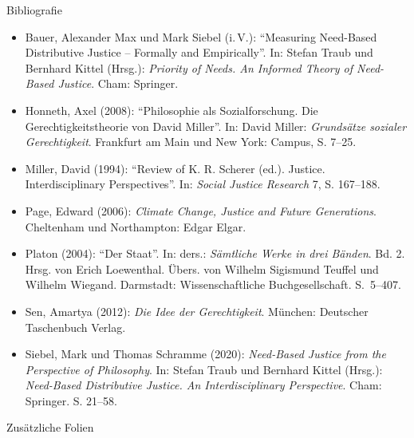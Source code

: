 \documentclass[xcolor=table,9pt,aspectratio=169]{beamer}
\begin{document}
\begin{frame}{\vspace*{10mm}Bibliografie}
\vspace*{-10mm}
{\footnotesize
\begin{itemize}[label=,leftmargin=2em,itemindent=-2em]
   \item Bauer, Alexander Max und Mark Siebel (i.\,V.): \enquote{Measuring Need-Based Distributive Justice -- Formally and Empirically}. In: Stefan Traub und Bernhard Kittel (Hrsg.): \textit{Priority of Needs. An Informed Theory of Need-Based Justice}. Cham: Springer.
   \item Honneth, Axel (2008): \enquote{Philosophie als Sozialforschung. Die Gerechtigkeitstheorie von David Miller}. In: David Miller: \textit{Grundsätze sozialer Gerechtigkeit}. Frankfurt am Main und New York: Campus, S. 7--25.
   \item Miller, David (1994): \enquote{Review of K. R. Scherer (ed.). Justice. Interdisciplinary Perspectives}. In: \textit{Social Justice Research} 7, S. 167--188.
   \item Page, Edward (2006): \textit{Climate Change, Justice and Future Generations}. Cheltenham und Northampton: Edgar Elgar.
   \item Platon (2004): \enquote{Der Staat}. In: ders.: \textit{Sämtliche Werke in drei Bänden}. Bd. 2. Hrsg. von Erich Loewenthal. Übers. von Wilhelm Sigismund Teuffel und Wilhelm Wiegand. Darmstadt: Wissenschaftliche Buchgesellschaft. S.~5--407.
   \item Sen, Amartya (2012): \textit{Die Idee der Gerechtigkeit}. München: Deutscher Taschenbuch Verlag.
   \item Siebel, Mark und Thomas Schramme (2020): \textit{Need-Based Justice from the Perspective of Philosophy}. In: Stefan Traub und Bernhard Kittel (Hrsg.): \textit{Need-Based Distributive Justice. An Interdisciplinary Perspective}. Cham: Springer. S. 21--58.
\end{itemize}
}
\end{frame}


\begin{frame}
\begin{overlayarea}{\textwidth}{0.81\paperheight}{
   \vspace*{11mm}
   \textcolor{uolblue}
   {Zusätzliche Folien}
}
\end{overlayarea}
\end{frame}
\end{document}
